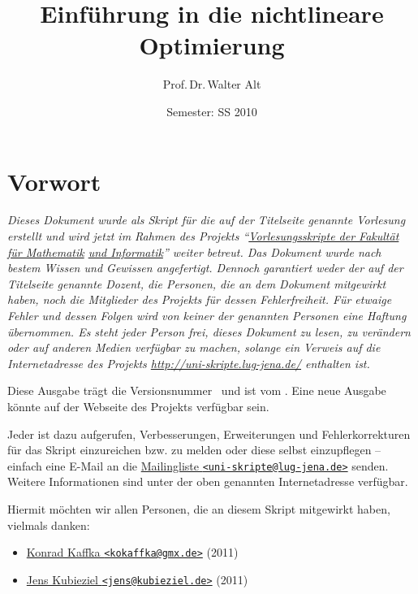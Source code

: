 \documentclass[ngerman,halfparskip]{scrartcl}
\theoremstyle{definition}
\begin{document}
\title{Einführung in die nichtlineare Optimierung}
\author{Prof.\,Dr.\,Walter Alt}
\date{Semester: SS 2010}
\maketitle

\clearpage
\section*{Vorwort}

{\itshape
  Dieses Dokument wurde als Skript für die auf der
  Titelseite genannte Vorlesung erstellt und wird jetzt im Rahmen des
  Projekts
  "`\href{http://uni-skripte.lug-jena.de/}
  {Vorlesungsskripte der Fakultät für Mathematik}
  \href{http://uni-skripte.lug-jena.de/}{und Informatik}"'
  weiter betreut. Das
  Dokument wurde nach bestem Wissen und Gewissen angefertigt. Dennoch
  garantiert weder der auf der Titelseite genannte Dozent, die Personen,
  die an dem Dokument mitgewirkt haben, noch die
  Mitglieder des Projekts für dessen Fehlerfreiheit. Für etwaige Fehler
  und dessen Folgen wird von keiner der genannten Personen eine Haftung
  übernommen. Es steht jeder Person frei, dieses Dokument zu lesen, zu
  verändern oder auf anderen Medien verfügbar zu machen, solange ein
  Verweis auf die Internetadresse des Projekts
  \url{http://uni-skripte.lug-jena.de/}
  enthalten ist.

  Diese Ausgabe trägt die Versionsnummer~\SVNLastChangedRevision{} und ist vom
  \SVNDate{}. Eine neue Ausgabe könnte auf der Webseite des Projekts verfügbar
  sein.

  Jeder ist dazu aufgerufen, Verbesserungen, Erweiterungen und
  Fehlerkorrekturen für das Skript einzureichen bzw. zu melden oder diese
  selbst einzupflegen -- einfach eine E-Mail an die
  \href{mailto:uni-skripte@lug-jena.de}{Mailingliste
  \nolinkurl{<uni-skripte@lug-jena.de>}} senden. Weitere Informationen
  sind unter der oben genannten Internetadresse verfügbar.

  Hiermit möchten wir allen Personen, die an diesem Skript mitgewirkt
  haben, vielmals danken:
  \begin{itemize}
   \item \href{mailto:kokaffka@gmx.de}{Konrad Kaffka \nolinkurl{<kokaffka@gmx.de>}} (2011)
   \item \href{mailto:jens@kubieziel.de}{Jens Kubieziel \nolinkurl{<jens@kubieziel.de>}} (2011)
  \end{itemize}
}
\end{document}
